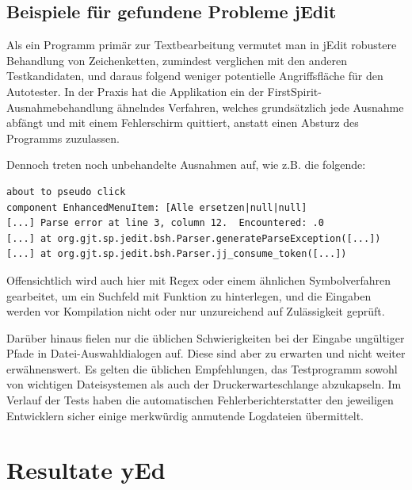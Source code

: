 \subsection{Beispiele für gefundene Probleme jEdit}

Als ein Programm primär zur Textbearbeitung vermutet man in jEdit 
robustere Behandlung von Zeichenketten,
zumindest verglichen mit den anderen Testkandidaten, und daraus
folgend weniger potentielle Angriffsfläche für den Autotester. In der Praxis
hat die Applikation ein der FirstSpirit-Ausnahmebehandlung ähnelndes
Verfahren, welches grundsätzlich jede Ausnahme abfängt und mit einem
Fehlerschirm quittiert, anstatt einen Absturz des Programms zuzulassen.

Dennoch treten noch unbehandelte Ausnahmen auf, wie z.B. die
folgende:

\begin{lstlisting}[float=!ht,label=fmjson,caption={Ausnahme jEdit bei Texteingabe}]
about to pseudo click 
component EnhancedMenuItem: [Alle ersetzen|null|null]
[...] Parse error at line 3, column 12.  Encountered: .0
[...] at org.gjt.sp.jedit.bsh.Parser.generateParseException([...])
[...] at org.gjt.sp.jedit.bsh.Parser.jj_consume_token([...])
\end{lstlisting}

Offensichtlich wird auch hier mit Regex oder einem ähnlichen
Symbolverfahren gearbeitet, um ein Suchfeld mit Funktion zu hinterlegen,
und die Eingaben werden vor Kompilation nicht oder nur unzureichend 
auf Zulässigkeit geprüft.

Darüber hinaus fielen nur die üblichen Schwierigkeiten bei der Eingabe
ungültiger Pfade in Datei-Auswahldialogen auf. Diese sind aber zu erwarten
und nicht weiter erwähnenswert. Es gelten die üblichen Empfehlungen,
das Testprogramm sowohl von wichtigen Dateisystemen als auch
der Druckerwarteschlange abzukapseln. Im Verlauf der Tests haben die
automatischen Fehlerberichterstatter den jeweiligen Entwicklern sicher
einige merkwürdig anmutende Logdateien übermittelt.




\section{Resultate yEd}\label{section:testresultsyed}

